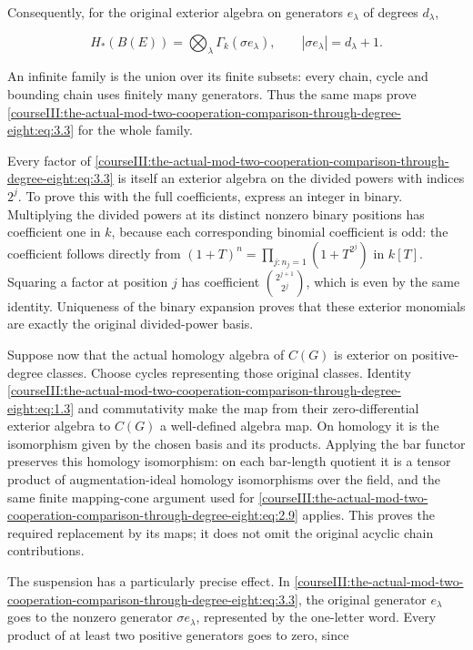 Consequently, for the original exterior algebra on generators \(e_\lambda\) of degrees \(d_\lambda\),

\begin{equation}
H_*(B(E))=
 \bigotimes_\lambda\Gamma_k(\sigma e_\lambda),
\qquad |\sigma e_\lambda|=d_\lambda+1.
\label{courseIII:the-actual-mod-two-cooperation-comparison-through-degree-eight:eq:3.3}
\end{equation}

An infinite family is the union over its finite subsets: every chain, cycle and bounding chain uses finitely many generators. Thus the same maps prove \eqref{courseIII:the-actual-mod-two-cooperation-comparison-through-degree-eight:eq:3.3} for the whole family.

Every factor of \eqref{courseIII:the-actual-mod-two-cooperation-comparison-through-degree-eight:eq:3.3} is itself an exterior algebra on the divided powers with indices \(2^j\). To prove this with the full coefficients, express an integer in binary. Multiplying the divided powers at its distinct nonzero binary positions has coefficient one in \(k\), because each corresponding binomial coefficient is odd: the coefficient follows directly from
\((1+T)^n=\prod_{j:n_j=1}(1+T^{2^j})\) in \(k[T]\). Squaring a factor at position \(j\) has coefficient \(\binom{2^{j+1}}{2^j}\), which is even by the same identity. Uniqueness of the binary expansion proves that these exterior monomials are exactly the original divided-power basis.

Suppose now that the actual homology algebra of \(C(G)\) is exterior on positive-degree classes. Choose cycles representing those original classes. Identity \eqref{courseIII:the-actual-mod-two-cooperation-comparison-through-degree-eight:eq:1.3} and commutativity make the map from their zero-differential exterior algebra to \(C(G)\) a well-defined algebra map. On homology it is the isomorphism given by the chosen basis and its products. Applying the bar functor preserves this homology isomorphism: on each bar-length quotient it is a tensor product of augmentation-ideal homology isomorphisms over the field, and the same finite mapping-cone argument used for \eqref{courseIII:the-actual-mod-two-cooperation-comparison-through-degree-eight:eq:2.9} applies. This proves the required replacement by its maps; it does not omit the original acyclic chain contributions.

The suspension has a particularly precise effect. In \eqref{courseIII:the-actual-mod-two-cooperation-comparison-through-degree-eight:eq:3.3}, the original generator \(e_\lambda\) goes to the nonzero generator \(\sigma e_\lambda\), represented by the one-letter word. Every product of at least two positive generators goes to zero, since

